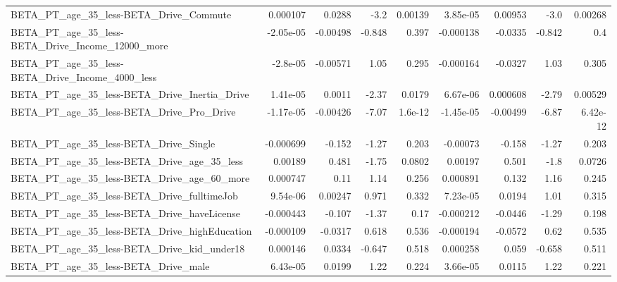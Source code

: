 \begin{tabular}{lrrrrrrrr}
BETA\_PT\_age\_35\_less-BETA\_Drive\_Commute             &    0.000107 &       0.0288 &     -3.2 &  0.00139 &   3.85e-05 &     0.00953 &         -3.0 &       0.00268 \\
BETA\_PT\_age\_35\_less-BETA\_Drive\_Income\_12000\_more   &   -2.05e-05 &     -0.00498 &   -0.848 &    0.397 &  -0.000138 &     -0.0335 &       -0.842 &           0.4 \\
BETA\_PT\_age\_35\_less-BETA\_Drive\_Income\_4000\_less    &    -2.8e-05 &     -0.00571 &     1.05 &    0.295 &  -0.000164 &     -0.0327 &         1.03 &         0.305 \\
BETA\_PT\_age\_35\_less-BETA\_Drive\_Inertia\_Drive       &    1.41e-05 &       0.0011 &    -2.37 &   0.0179 &   6.67e-06 &    0.000608 &        -2.79 &       0.00529 \\
BETA\_PT\_age\_35\_less-BETA\_Drive\_Pro\_Drive           &   -1.17e-05 &     -0.00426 &    -7.07 &  1.6e-12 &  -1.45e-05 &    -0.00499 &        -6.87 &      6.42e-12 \\
BETA\_PT\_age\_35\_less-BETA\_Drive\_Single              &   -0.000699 &       -0.152 &    -1.27 &    0.203 &   -0.00073 &      -0.158 &        -1.27 &         0.203 \\
BETA\_PT\_age\_35\_less-BETA\_Drive\_age\_35\_less         &     0.00189 &        0.481 &    -1.75 &   0.0802 &    0.00197 &       0.501 &         -1.8 &        0.0726 \\
BETA\_PT\_age\_35\_less-BETA\_Drive\_age\_60\_more         &    0.000747 &         0.11 &     1.14 &    0.256 &   0.000891 &       0.132 &         1.16 &         0.245 \\
BETA\_PT\_age\_35\_less-BETA\_Drive\_fulltimeJob         &    9.54e-06 &      0.00247 &    0.971 &    0.332 &   7.23e-05 &      0.0194 &         1.01 &         0.315 \\
BETA\_PT\_age\_35\_less-BETA\_Drive\_haveLicense         &   -0.000443 &       -0.107 &    -1.37 &     0.17 &  -0.000212 &     -0.0446 &        -1.29 &         0.198 \\
BETA\_PT\_age\_35\_less-BETA\_Drive\_highEducation       &   -0.000109 &      -0.0317 &    0.618 &    0.536 &  -0.000194 &     -0.0572 &         0.62 &         0.535 \\
BETA\_PT\_age\_35\_less-BETA\_Drive\_kid\_under18         &    0.000146 &       0.0334 &   -0.647 &    0.518 &   0.000258 &       0.059 &       -0.658 &         0.511 \\
BETA\_PT\_age\_35\_less-BETA\_Drive\_male                &    6.43e-05 &       0.0199 &     1.22 &    0.224 &   3.66e-05 &      0.0115 &         1.22 &         0.221 \\

\end{tabular}
